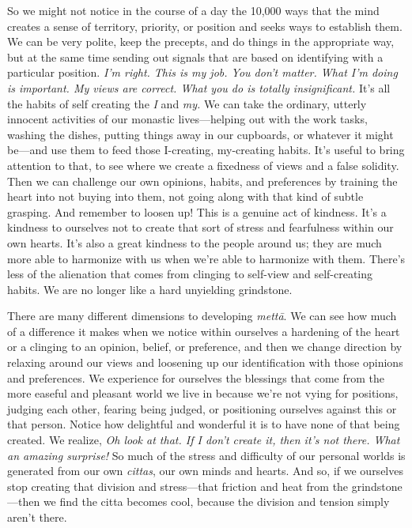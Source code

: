So we might not notice in the course of a day the 10,000 ways that the 
mind creates a sense of territory, priority, or position and seeks ways 
to establish them. We can be very polite, keep the precepts, and do 
things in the appropriate way, but at the same time sending out signals 
that are based on identifying with a particular position. \emph{I'm 
right. This is my job. You don't matter. What I'm doing is important. 
My views are correct. What you do is totally insignificant.} It's all 
the habits of self creating the \emph{I} and \emph{my.} We can take the 
ordinary, utterly innocent activities of our monastic lives---helping 
out with the work tasks, washing the dishes, putting things away in our 
cupboards, or whatever it might be---and use them to feed those 
I-creating, my-creating habits. It's useful to bring attention to that, 
to see where we create a fixedness of views and a false solidity. Then 
we can challenge our own opinions, habits, and preferences by training 
the heart into not buying into them, not going along with that kind of 
subtle grasping. And remember to loosen up! This is a genuine act of 
kindness. It's a kindness to ourselves not to create that sort of 
stress and fearfulness within our own hearts. It's also a great 
kindness to the people around us; they are much more able to harmonize 
with us when we're able to harmonize with them. There's less of the 
alienation that comes from clinging to self-view and self-creating 
habits. We are no longer like a hard unyielding grindstone.

There are many different dimensions to developing \emph{mettā}. We can 
see how much of a difference it makes when we notice within ourselves a 
hardening of the heart or a clinging to an opinion, belief, or 
preference, and then we change direction by relaxing around our views 
and loosening up our identification with those opinions and 
preferences. We experience for ourselves the blessings that come from 
the more easeful and pleasant world we live in because we're not vying 
for positions, judging each other, fearing being judged, or positioning 
ourselves against this or that person. Notice how delightful and 
wonderful it is to have none of that being created. We realize, 
\emph{Oh look at that. If I don't create it, then it's not there. What 
an amazing surprise!} So much of the stress and difficulty of our 
personal worlds is generated from our own \emph{cittas}, our own minds 
and hearts. And so, if we ourselves stop creating that division and 
stress---that friction and heat from the grindstone---then we find the 
citta becomes cool, because the division and tension simply aren't 
there.

